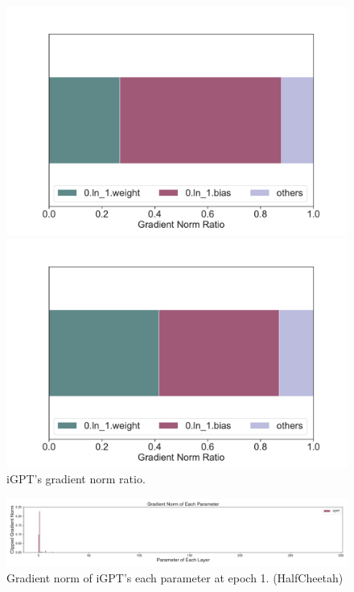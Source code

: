 \documentclass{article}
\begin{document}
\begin{figure}[H]
    \centering
    \begin{minipage}[b]{0.48\linewidth}
        \includegraphics[width=\linewidth]{figs/gradnorm_perparam_ratio_1_igpt_halfcheetah_medium_666.pdf}
    \end{minipage}
    \begin{minipage}[b]{0.48\linewidth}
        \includegraphics[width=\linewidth]{figs/gradnorm_perparam_ratio_1_igpt_walker2d_medium_666.pdf}
    \end{minipage}
    \caption{iGPT's gradient norm ratio.}
\end{figure}

\begin{figure}[H]
    \centering
        \includegraphics[width=\linewidth]{figs/gradnorm_perparam_1_igpt_halfcheetah_medium_666.pdf}
    \caption{Gradient norm of iGPT's each parameter at epoch 1. (HalfCheetah)}
\end{figure}
\end{document}

